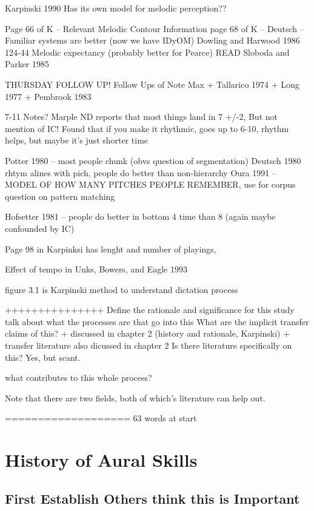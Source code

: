 \documentclass[]{book}
\theoremstyle{definition}
\theoremstyle{definition}
\theoremstyle{definition}
\theoremstyle{remark}
\begin{document}
Karpinski 1990 Has its own model for melodic perception??

Page 66 of K -- Relevant Melodic Contour Information page 68 of K --
Deutsch -- Familiar systems are better (now we have IDyOM) Dowling and
Harwood 1986 124-44 Melodic expectancy (probably better for Pearce) READ
Sloboda and Parker 1985

THURSDAY FOLLOW UP! Follow Ups of Note Max + Tallarico 1974 + Long 1977
+ Pembrook 1983

7-11 Notes? Marple ND reports that most things land in 7 +/-2, But not
mention of IC! Found that if you make it rhythmic, goes up to 6-10,
rhythm helps, but maybe it's just shorter time

Potter 1980 -- most people chunk (obvs question of segmentation) Deutsch
1980 rhtym alines with pich, people do better than non-hierarchy Oura
1991 -- MODEL OF HOW MANY PITCHES PEOPLE REMEMBER, use for corpus
question on pattern matching

Hofsetter 1981 -- people do better in bottom 4 time than 8 (again maybe
confounded by IC)

Page 98 in Karpinksi has lenght and number of playings,

Effect of tempo in Unks, Bowers, and Eagle 1993

figure 3.1 is Karpinski method to understand dictation process

+++++++++++++++ Define the rationale and significance for this study
talk about what the processes are that go into this What are the
implicit transfer claims of this? + discussed in chapter 2 (history and
rationale, Karpinski) + transfer literature also dicussed in chapter 2
Is there literature specifically on this? Yes, but scant.

what contributes to this whole process?

Note that there are two fields, both of which's literature can help out.

=================== 63 words at start

\hypertarget{history-of-aural-skills}{%
\chapter{History of Aural Skills}\label{history-of-aural-skills}}

\hypertarget{first-establish-others-think-this-is-important}{%
\section{First Establish Others think this is
Important}\label{first-establish-others-think-this-is-important}}
\end{document}

